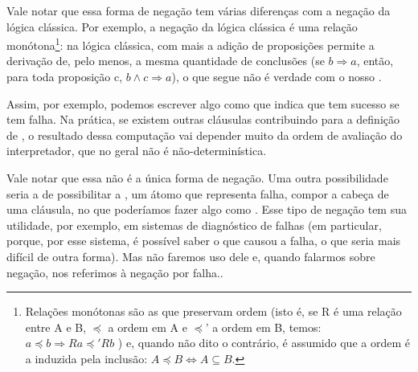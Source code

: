 \documentclass{article}
\begin{document}
Vale notar que essa forma de negação tem várias diferenças com a negação da lógica clássica. Por exemplo, a negação da lógica clássica é uma relação monótona\footnote{Relações monótonas são as que preservam ordem (isto é, se R é uma relação entre A e B, $\preceq$ a ordem em A e $\preceq$' a ordem em B, temos: $a \preceq b \Rightarrow Ra \preceq' Rb$ ) e, quando não dito o contrário, é assumido que a ordem é a induzida pela inclusão: $A \preceq B \Leftrightarrow A \subseteq B$.}: na lógica clássica, com mais a adição de proposições permite a derivação de, pelo menos, a mesma quantidade de conclusões (se $b \Rightarrow a$, então, para toda proposição c, $b \wedge c \Rightarrow a$), o que segue não é verdade com o nosso .

Assim, por exemplo, podemos escrever algo como  que indica que  tem sucesso se  tem falha. Na prática, se existem outras cláusulas contribuindo para a definição de , o resultado dessa computação vai depender muito da ordem de avaliação do interpretador, que no geral não é não-determinística.

Vale notar que essa não é a única forma de negação. Uma outra possibilidade seria a de possibilitar
a , um átomo que representa falha, compor a cabeça de uma cláusula, no que poderíamos fazer algo como .
Esse tipo de negação tem sua utilidade, por exemplo, em sistemas de diagnóstico de falhas (em particular, porque, por esse sistema, é possível saber o que causou a falha, o que seria mais difícil de outra forma). Mas não faremos uso dele e, quando
falarmos sobre negação, nos referimos à negação por falha..
\end{document}
